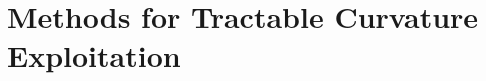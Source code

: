\section{Methods for Tractable Curvature Exploitation}
\label{sec:tractable_curvature_exploitation}






